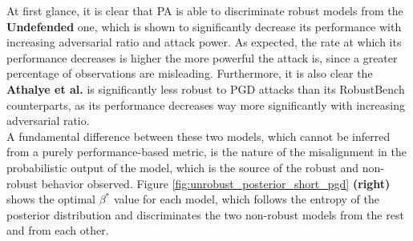 At first glance, it is clear that PA is able to discriminate robust models from
the {\color{tab:orange} \textbf{Undefended}} one, which is shown to significantly
decrease its performance with increasing adversarial ratio and attack power. As expected, 
the rate at which its performance decreases is higher the more powerful the attack is, 
since a greater percentage of observations are misleading. Furthermore, 
it is also clear the {\color{tab:green} \textbf{Athalye et al.}}
is significantly less robust to PGD attacks than its RobustBench counterparts, as 
its performance decreases way more significantly with increasing adversarial ratio. \\

A fundamental difference between these two models, which cannot be
inferred from a purely performance-based metric, is the nature of the misalignment in
the probabilistic output of the model, which is the source of the robust and non-robust
behavior observed. Figure \ref{fig:unrobust_posterior_short_pgd} \textbf{(right)}
shows the optimal $\beta^{*}$ value for each model, which follows
the entropy of the posterior distribution and discriminates the two non-robust
models from the rest and from each other.


